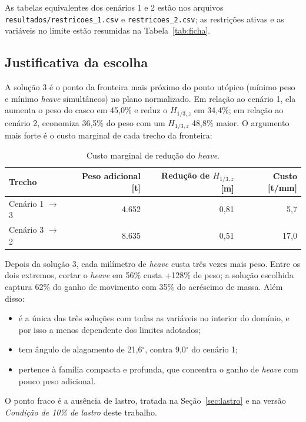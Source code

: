 \documentclass[11pt,a4paper]{article}
\newcommand{\Hz}{H_{1/3,z}}
\begin{document}
As tabelas equivalentes dos cenários 1 e 2 estão nos arquivos
\texttt{resultados/restricoes\_1.csv} e \texttt{restricoes\_2.csv}; as restrições ativas e as
variáveis no limite estão resumidas na Tabela~\ref{tab:ficha}.

\subsection{Justificativa da escolha}

A solução 3 é o ponto da fronteira mais próximo do ponto utópico (mínimo peso e mínimo
\emph{heave} simultâneos) no plano normalizado. Em relação ao cenário 1, ela aumenta o peso do
casco em 45,0\% e reduz o $\Hz$ em 34,4\%; em relação ao cenário 2, economiza 36,5\% do peso
com um $\Hz$ 48,8\% maior. O argumento mais forte é o custo marginal de cada trecho da
fronteira:

\begin{table}[H]
\centering
\caption{Custo marginal de redução do \emph{heave}.}\label{tab:custo}
\begin{tabular}{lrrr}
\toprule
Trecho & Peso adicional [t] & Redução de $\Hz$ [m] & Custo [t/mm] \\
\midrule
Cenário 1 $\to$ 3 & 4.652 & 0,81 & 5,7 \\
Cenário 3 $\to$ 2 & 8.635 & 0,51 & 17,0 \\
\bottomrule
\end{tabular}
\end{table}

Depois da solução 3, cada milímetro de \emph{heave} custa três vezes mais peso. Entre os dois
extremos, cortar o \emph{heave} em 56\% custa +128\% de peso; a solução escolhida captura 62\% do
ganho de movimento com 35\% do acréscimo de massa. Além disso:
\begin{itemize}
\item é a única das três soluções com todas as variáveis no interior do domínio, e por isso a
menos dependente dos limites adotados;
\item tem ângulo de alagamento de 21,6$^\circ$, contra 9,0$^\circ$ do cenário 1;
\item pertence à família compacta e profunda, que concentra o ganho de \emph{heave} com pouco
peso adicional.
\end{itemize}
O ponto fraco é a ausência de lastro, tratada na Seção~\ref{sec:lastro} e na versão
\emph{Condição de 10\% de lastro} deste trabalho.

\end{document}
